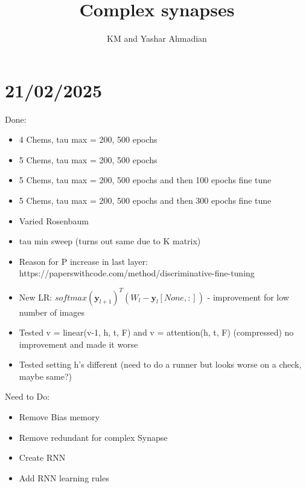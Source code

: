 \documentclass[11pt]{article}
\title{Complex synapses}
\author[1]{KM and Yashar Ahmadian}%
\renewcommand\b\mathbf
\theoremstyle{remark}%
\theoremstyle{definition}
\newcommand{\y}{\b{y}}
\begin{document}
\maketitle


\section*{21/02/2025}

Done:
\begin{itemize}
  \item 4 Chems, tau max = 200, 500 epochs
  \item 5 Chems, tau max = 200, 500 epochs
  \item 5 Chems, tau max = 200, 500 epochs and then 100 epochs fine tune
  \item 5 Chems, tau max = 200, 500 epochs and then 300 epochs fine tune
  \item Varied Rosenbaum
  \item tau min sweep (turns out same due to K matrix)
  \item Reason for P increase in last layer: https://paperswithcode.com/method/discriminative-fine-tuning
  \item New LR: $softmax(\y_{l+1})^T (W_l - \y_l[None,:]) $ - improvement for low number of images
  \item Tested v = linear(v-1, h, t, F) and v = attention(h, t, F) (compressed) no improvement and made it worse
  \item Tested setting h's different (need to do a runner but looks worse on a check, maybe same?)  
\end{itemize}

Need to Do:

\begin{itemize}
  \item Remove Bias memory
  \item Remove redundant for complex Synapse
  \item Create RNN
  \item Add RNN learning rules
\end{itemize}
\end{document}
